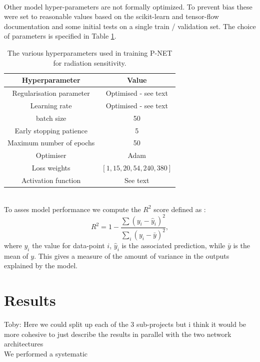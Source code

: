 \documentclass[NOTE, disdraft=true, UKenglish]{\DISCDTLATEXPATH UCLCDTDISdoc}
\begin{document}
\\ \indent Other model hyper-parameters are not formally optimized. To prevent bias these were set to reasonable values based on the scikit-learn and tensor-flow documentation and some initial tests on a single train / validation set. 
The choice of parameters is specified in Table \ref{tab:hyperpars}.
\begin{table}[]
    \centering
    \begin{tabular}{c|c}
       Hyperparameter  &  Value \\ \hline
       Regularisation parameter & Optimised - see text \\
       Learning rate  & Optimised - see text \\
      batch size  & 50 \\
      Early stopping patience &  5 \\
     Maximum number of epochs &  50 \\
     Optimiser &   Adam \\
     Loss weights &  $[1, 15, 20, 54, 240, 380]$ \\
     Activation function &  See text\\
    \end{tabular}
    \caption{The various hyperparameters used in training P-NET for radiation sensitivity.}
    \label{tab:hyperpars}
\end{table}
\\ \indent To asses model performance we compute the $R^2$ score defined as \cite{scikit-learn-docs}:
\begin{equation}
    R^2 = 1-\frac{\sum (y_i - \hat{y}_i)^2}{\sum_i (y_i - \bar{y})^2},
\end{equation}
where $y_i$ the value for data-point $i$, $\hat{y}_i$ is the associated prediction, while $\bar{y}$ is the mean of $y$. This gives a measure of the amount of variance in the outputs explained by the model.
%



\section{Results}
\label{sec:results}
{\color{red}Toby: Here we could split up each of the 3 sub-projects but i think it would be more cohesive to just describe the results in parallel with the two network architectures}
\\
We performed a systematic
\end{document}
